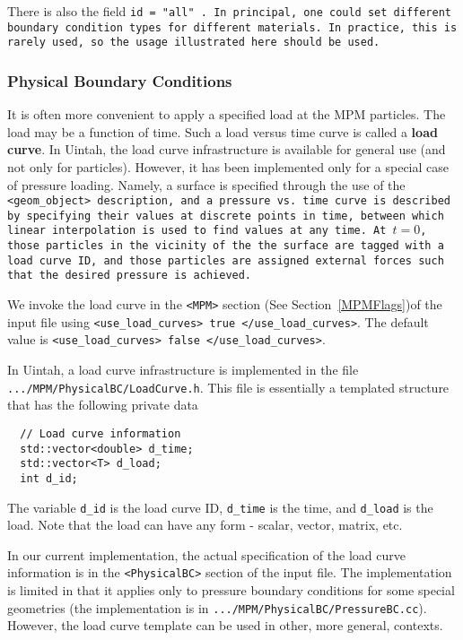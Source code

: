 There is also the field \tt id = "all" \normalfont.  In principal, one could
set different boundary condition types for different materials.  In practice,
this is rarely used, so the usage illustrated here should be used.

\subsubsection{Physical Boundary Conditions} \label{PhysicalBCs}

It is often more convenient to apply a specified load at the MPM particles.
The load may be a function of time.  Such a load versus time curve is called
a {\bf load curve}.
In Uintah, the load curve infrastructure is available for general use
(and not only for particles).  However, it has been implemented only for
a special case of pressure loading.  Namely, a surface is
specified through the use of the \tt <geom\_object> \normalfont description,
and a pressure vs. time curve is described by specifying their values
at discrete points in time, between which linear interpolation is used
to find values at any time.  At $t=0$, those particles in the vicinity
of the the surface are tagged with a load curve ID, and those particles
are assigned external forces such that the desired pressure is achieved.

We invoke the load curve in the \verb|<MPM>| section
(See Section~\ref{MPMFlags})of the input file
using  \verb|<use_load_curves> true </use_load_curves>|.  The default value
is \verb|<use_load_curves> false </use_load_curves>|.

In Uintah, a load curve infrastructure is implemented in the file \\
\verb|.../MPM/PhysicalBC/LoadCurve.h|.  This file is essentially a templated
structure that has the following private data
\begin{verbatim}
  // Load curve information 
  std::vector<double> d_time;
  std::vector<T> d_load;
  int d_id;
\end{verbatim}
The variable \verb|d_id| is the load curve ID, \verb|d_time| is the time,
and \verb|d_load| is the load.  Note that the load can have any form - scalar,
vector, matrix, etc.

In our current implementation, the actual specification of the load curve
information is in the \verb|<PhysicalBC>| section of the input file.  The
implementation is limited in that it applies only to pressure boundary
conditions for some special geometries (the implementation is in
\verb|.../MPM/PhysicalBC/PressureBC.cc|).  However, the load curve template can
be used in other, more general, contexts.

